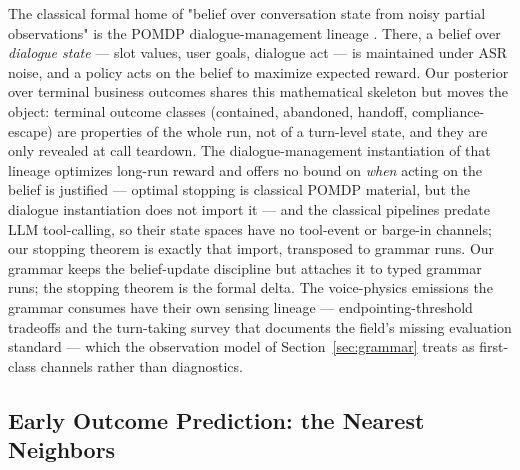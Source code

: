 The classical formal home of "belief over conversation state from noisy partial observations" is the POMDP dialogue-management lineage \citep{young2013pomdp}.
There, a belief over \emph{dialogue state} --- slot values, user goals, dialogue act --- is maintained under ASR noise, and a policy acts on the belief to maximize expected reward.
Our posterior over terminal business outcomes shares this mathematical skeleton but moves the object: terminal outcome classes (contained, abandoned, handoff, compliance-escape) are properties of the whole run, not of a turn-level state, and they are only revealed at call teardown.
The dialogue-management instantiation of that lineage optimizes long-run reward and offers no
bound on \emph{when} acting on the belief is justified --- optimal stopping is classical POMDP
material, but the dialogue instantiation does not import it --- and the classical pipelines
predate LLM tool-calling, so their state spaces have no tool-event or barge-in channels; our
stopping theorem is exactly that import, transposed to grammar runs.
Our grammar keeps the belief-update discipline but attaches it to typed grammar runs; the stopping theorem is the formal delta.
The voice-physics emissions the grammar consumes have their own sensing lineage --- endpointing-threshold tradeoffs \citep{raux2008optimizing} and the turn-taking survey that documents the field's missing evaluation standard \citep{skantze2021turn} --- which the observation model of Section~\ref{sec:grammar} treats as first-class channels rather than diagnostics.

\subsection{Early Outcome Prediction: the Nearest Neighbors}

